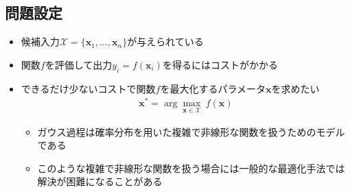 \documentclass[dvipdfmx, 10.5pt]{beamer}
\begin{document}



\subsection{問題設定}
\begin{frame}{\insertsubsection}
	\begin{itemize}
		\item 候補入力$\mathcal{X} = \{ \bm x_1, \ldots, \bm x_n \}$が与えられている

		\item 関数$f$を評価して出力$y_i = f(\bm x_i)$を得るにはコストがかかる

		\item できるだけ少ないコストで関数$f$を最大化するパラメータ$\bm x$を求めたい
		\begin{align*}
			\bm x^* = \arg \max_{\bm x \in \mathcal{X}} ~ f(\bm x)
		\end{align*}
		\begin{itemize}
			\item ガウス過程は確率分布を用いた複雑で非線形な関数を扱うためのモデルである
			\item このような複雑で非線形な関数を扱う場合には一般的な最適化手法では解決が困難になることがある
		\end{itemize}
	\end{itemize}
\end{frame}

\end{document}

